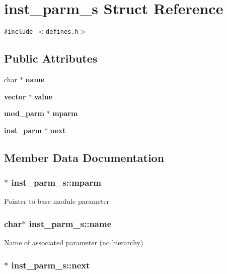 \section{inst\_\-parm\_\-s Struct Reference}
\label{structinst__parm__s}
{\tt \#include $<$defines.h$>$}

\subsection*{Public Attributes}
\begin{CompactItemize}
\item 
char $\ast$ {\bf name}
\item 
{\bf vector} $\ast$ {\bf value}
\item 
{\bf mod\_\-parm} $\ast$ {\bf mparm}
\item 
{\bf inst\_\-parm} $\ast$ {\bf next}
\end{CompactItemize}


\subsection{Member Data Documentation}
\subsubsection{$\ast$ {\bf inst\_\-parm\_\-s::mparm}}\label{structinst__parm__s_o2}


Pointer to base module parameter 
\subsubsection{\setlength{\rightskip}{0pt plus 5cm}char$\ast$ {\bf inst\_\-parm\_\-s::name}}\label{structinst__parm__s_o0}


Name of associated parameter (no hierarchy) 
\subsubsection{$\ast$ {\bf inst\_\-parm\_\-s::next}}\label{structinst__parm__s_o3}


